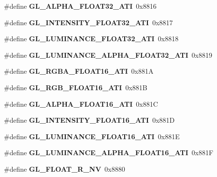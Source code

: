 \begin{DoxyCompactItemize}
\item 
\#define {\bfseries G\+L\+\_\+\+A\+L\+P\+H\+A\+\_\+\+F\+L\+O\+A\+T32\+\_\+\+A\+T\+I}~0x8816\label{_s_d_l__opengl_8h_a005c6e888c1db7ce0421e0cc882d2bb9}

\item 
\#define {\bfseries G\+L\+\_\+\+I\+N\+T\+E\+N\+S\+I\+T\+Y\+\_\+\+F\+L\+O\+A\+T32\+\_\+\+A\+T\+I}~0x8817\label{_s_d_l__opengl_8h_a717b4d6603b9e8ca2015ae96d071494e}

\item 
\#define {\bfseries G\+L\+\_\+\+L\+U\+M\+I\+N\+A\+N\+C\+E\+\_\+\+F\+L\+O\+A\+T32\+\_\+\+A\+T\+I}~0x8818\label{_s_d_l__opengl_8h_a9aa646407bd99059ebd561b994e3e49a}

\item 
\#define {\bfseries G\+L\+\_\+\+L\+U\+M\+I\+N\+A\+N\+C\+E\+\_\+\+A\+L\+P\+H\+A\+\_\+\+F\+L\+O\+A\+T32\+\_\+\+A\+T\+I}~0x8819\label{_s_d_l__opengl_8h_a8cb3cb4e833a7b94d5bff965ecb21288}

\item 
\#define {\bfseries G\+L\+\_\+\+R\+G\+B\+A\+\_\+\+F\+L\+O\+A\+T16\+\_\+\+A\+T\+I}~0x881\+A\label{_s_d_l__opengl_8h_a9a4db55ec2c8a231084bd03a4de05bcb}

\item 
\#define {\bfseries G\+L\+\_\+\+R\+G\+B\+\_\+\+F\+L\+O\+A\+T16\+\_\+\+A\+T\+I}~0x881\+B\label{_s_d_l__opengl_8h_a1930d98e479ef7f743d2d877727706e2}

\item 
\#define {\bfseries G\+L\+\_\+\+A\+L\+P\+H\+A\+\_\+\+F\+L\+O\+A\+T16\+\_\+\+A\+T\+I}~0x881\+C\label{_s_d_l__opengl_8h_a700db85f4b8bdc642c957ad06ae0bde9}

\item 
\#define {\bfseries G\+L\+\_\+\+I\+N\+T\+E\+N\+S\+I\+T\+Y\+\_\+\+F\+L\+O\+A\+T16\+\_\+\+A\+T\+I}~0x881\+D\label{_s_d_l__opengl_8h_a5ace64eda1fdea76a35f1124377e311c}

\item 
\#define {\bfseries G\+L\+\_\+\+L\+U\+M\+I\+N\+A\+N\+C\+E\+\_\+\+F\+L\+O\+A\+T16\+\_\+\+A\+T\+I}~0x881\+E\label{_s_d_l__opengl_8h_aeded330853753d93124eedcf2c8365d5}

\item 
\#define {\bfseries G\+L\+\_\+\+L\+U\+M\+I\+N\+A\+N\+C\+E\+\_\+\+A\+L\+P\+H\+A\+\_\+\+F\+L\+O\+A\+T16\+\_\+\+A\+T\+I}~0x881\+F\label{_s_d_l__opengl_8h_a9faa131e152b7d30fc90378843ba582b}

\item 
\#define {\bfseries G\+L\+\_\+\+F\+L\+O\+A\+T\+\_\+\+R\+\_\+\+N\+V}~0x8880\label{_s_d_l__opengl_8h_a0e35b68a0ca3960e4d02007f106cdc95}


\end{DoxyCompactItemize}
